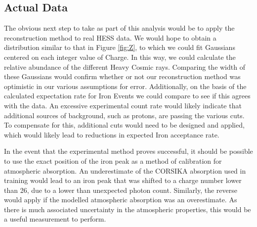 \documentclass[11pt]{article}
\begin{document}
\subsection{Actual Data}
The obvious next step to take as part of this analysis would be to apply the reconstruction method to real HESS data. We would hope to obtain a distribution similar to that in Figure \ref{fig:Z}, to which we could fit Gaussians centered on each integer value of Charge. In this way, we could calculate the relative abundance of the different Heavy Cosmic rays. Comparing the width of these Gaussians would confirm whether or not our reconstruction method was optimistic in our various assumptions for error. Additionally, on the basis of the calculated expectation rate for Iron Events we could compare to see if this agrees
with the data. An excessive experimental count rate would likely indicate that additional sources of background, such as protons, are passing the various cuts. To compensate for this, additional cuts would need to be designed and applied, which would likely lead to reductions in expected Iron acceptance rate.

In the event that the experimental method proves successful, it should be possible to use the exact position of the iron peak as a method of calibration for atmospheric absorption. An underestimate of the CORSIKA absorption used in training would lead to an iron peak that was shifted to a charge number lower than 26, due to a lower than unexpected photon count. Similarly, the reverse would apply if the modelled atmospheric absorption was an overestimate. As there is much associated uncertainty in the atmospheric properties, this would be a useful measurement to perform.
\end{document}
